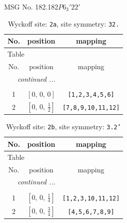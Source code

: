 \documentclass[fleqn,8pt]{jsarticle}
\begin{document}
\setcounter{MaxMatrixCols}{32}

\renewcommand{\tablename}{Table~}
\renewcommand{\figurename}{Figure~}
\begin{center}
\LARGE
MSG No. 182.182\quad$P6_{3}'22'$
\end{center}
\renewcommand{\arraystretch}{1.2}
\begin{longtable}{ccc}
\caption{Wyckoff site: {\tt 2a}, site symmetry: {\tt 32.}}
 \\
 \hline \hline
No. & position & mapping \\ \hline \endfirsthead

\multicolumn{2}{l}{\tablename\ \thetable{}} \\
 \hline \hline
No. & position & mapping \\ \hline \endhead

 \hline \hline
\multicolumn{2}{r}{\footnotesize\it continued ...} \\ \endfoot

 \hline \hline
\multicolumn{2}{r}{} \\ \endlastfoot

1 & $\left[ 0,\, 0,\, 0 \right]$ & {\tt [1,2,3,4,5,6]} \\ \hline
2 & $\left[ 0,\, 0,\, \frac{1}{2} \right]$ & {\tt [7,8,9,10,11,12]} \\
\end{longtable}
\renewcommand{\arraystretch}{1.2}
\begin{longtable}{ccc}
\caption{Wyckoff site: {\tt 2b}, site symmetry: {\tt 3.2'}}
 \\
 \hline \hline
No. & position & mapping \\ \hline \endfirsthead

\multicolumn{2}{l}{\tablename\ \thetable{}} \\
 \hline \hline
No. & position & mapping \\ \hline \endhead

 \hline \hline
\multicolumn{2}{r}{\footnotesize\it continued ...} \\ \endfoot

 \hline \hline
\multicolumn{2}{r}{} \\ \endlastfoot

1 & $\left[ 0,\, 0,\, \frac{1}{4} \right]$ & {\tt [1,2,3,10,11,12]} \\ \hline
2 & $\left[ 0,\, 0,\, \frac{3}{4} \right]$ & {\tt [4,5,6,7,8,9]} \\
\end{longtable}
\end{document}
